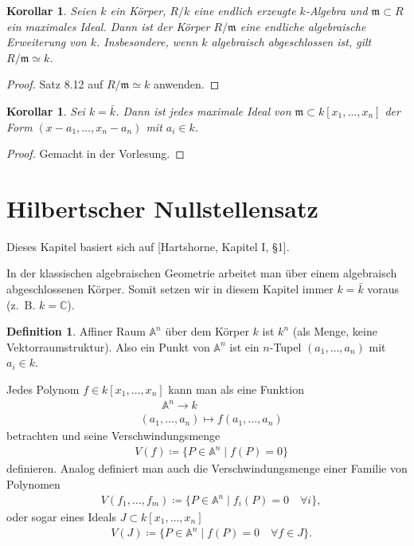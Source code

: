 \documentclass[reqno,12pt]{article}
\numberwithin{equation}{section}
\newcommand{\bA}{\mathbb{A}}
\newcommand{\bC}{\mathbb{C}}
\newcommand{\iso}{\simeq}
\theoremstyle{plain}
\newtheorem{cor}[thm]{Korollar}
\theoremstyle{definition}
\newtheorem{definition}[thm]{Definition}
\begin{document}
\begin{cor}\label{weak-nullstellensatz}
Seien $k$ ein Körper, $R/k$ eine endlich erzeugte $k$-Algebra und $\mathfrak{m} \subset R$ ein maximales Ideal. Dann ist der Körper $R/\mathfrak{m}$ eine endliche algebraische Erweiterung von $k$. Insbesondere, wenn $k$ algebraisch abgeschlossen ist, gilt $R/\mathfrak{m} \iso k$.
\end{cor}

\begin{proof}
Satz 8.12 auf $R/\mathfrak{m} \iso k$ anwenden.
\end{proof}

\begin{cor}
Sei $k = \bar{k}$. Dann ist jedes maximale Ideal von $\mathfrak{m} \subset k[x_1, \dots, x_n]$ der Form $(x-a_1, \dots, x_n-a_n)$ mit $a_i \in k$.
\end{cor}

\begin{proof}
Gemacht in der Vorlesung.
\end{proof}


\newpage
\section{Hilbertscher Nullstellensatz}


Dieses Kapitel basiert sich auf [Hartshorne, Kapitel I, §1].

\smallskip

In der klassischen algebraischen Geometrie arbeitet man über einem algebraisch abgeschlossenen Körper. Somit setzen wir in diesem Kapitel immer $k = \bar{k}$ voraus (z.~B. $k = \bC$).


\begin{definition}
{\sf Affiner Raum} $\bA^n$ über dem Körper $k$ ist $k^n$ (als Menge, keine Vektorraumstruktur). Also ein Punkt von $\bA^n$ ist ein $n$-Tupel $(a_1, \dots, a_n)$ mit $a_i \in k$.
\end{definition}

Jedes Polynom $f \in k[x_1, \dots, x_n]$ kann man als eine Funktion
\begin{align*}
& \qquad \bA^n \to k  \\
& (a_1, \dots, a_n)\mapsto f(a_1, \dots, a_n)
\end{align*}
betrachten und seine {\sf Verschwindungsmenge}
\begin{align*}
& V(f) \coloneqq \{P \in \bA^n \mid f(P)=0 \}
\end{align*}
definieren. Analog definiert man auch die Verschwindungsmenge einer Familie von Polynomen
\begin{align*}
& V(f_1, \dots , f_m) \coloneqq \{P \in \bA^n \mid f_i(P)=0 \quad \forall i \},
\end{align*}
oder sogar eines Ideals $J \subset k[x_1, \dots, x_n]$
\begin{align*}
& V(J) \coloneqq \{P \in \bA^n \mid f(P)=0 \quad \forall f \in J \}.
\end{align*}
\end{document}
